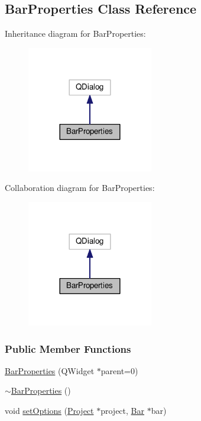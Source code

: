 \hypertarget{class_bar_properties}{}\subsection{Bar\+Properties Class Reference}
\label{class_bar_properties}


Inheritance diagram for Bar\+Properties\+:
\nopagebreak
\begin{figure}[H]
\begin{center}
\leavevmode
\includegraphics[width=156pt]{class_bar_properties__inherit__graph}
\end{center}
\end{figure}


Collaboration diagram for Bar\+Properties\+:
\nopagebreak
\begin{figure}[H]
\begin{center}
\leavevmode
\includegraphics[width=156pt]{class_bar_properties__coll__graph}
\end{center}
\end{figure}
\subsubsection*{Public Member Functions}
\begin{DoxyCompactItemize}
\item 
\hyperlink{class_bar_properties_a7c14a54f430cabfe872869799076025b}{Bar\+Properties} (Q\+Widget $\ast$parent=0)
\item 
\hyperlink{class_bar_properties_a639b4da849970025a2935ee965d6a465}{$\sim$\+Bar\+Properties} ()
\item 
void \hyperlink{class_bar_properties_a80cba99404820272603c4da8fb708c05}{set\+Options} (\hyperlink{class_project}{Project} $\ast$project, \hyperlink{class_bar}{Bar} $\ast$bar)
\end{DoxyCompactItemize}


